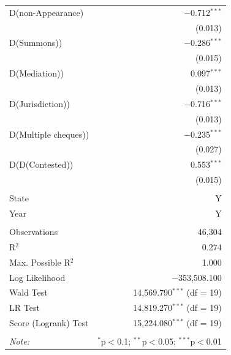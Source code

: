 \documentclass[12pt,a4paper]{article}
\begin{document}
\begin{appendices}
{\begin{longtable}[h]{lr}
 D(non-Appearance) & $-$0.712$^{***}$ \\ 
 & (0.013) \\ 
 D(Summons)) & $-$0.286$^{***}$ \\ 
 & (0.015) \\ 
 D(Mediation)) & 0.097$^{***}$ \\ 
 & (0.013) \\ 
 D(Jurisdiction)) & $-$0.716$^{***}$ \\ 
 & (0.013) \\ 
 D(Multiple cheques)) & $-$0.235$^{***}$ \\ 
 & (0.027) \\ 
 D(D(Contested)) & 0.553$^{***}$ \\ 
 & (0.015) \\ 
 \hline \\[-1.8ex]
 State & Y \\
 Year & Y \\ 
 \hline \\[-1.8ex]
 Observations & 46,304 \\ 
 R$^{2}$ & 0.274 \\ 
 Max. Possible R$^{2}$ & 1.000 \\ 
 Log Likelihood & $-$353,508.100 \\ 
 Wald Test & 14,569.790$^{***}$ (df = 19) \\ 
 LR Test & 14,819.270$^{***}$ (df = 19) \\ 
 Score (Logrank) Test & 15,224.080$^{***}$ (df = 19) \\ 
 \hline 
 \hline \\[-1.8ex] 
 \textit{Note:} & \multicolumn{1}{r}{$^{*}$p$<$0.1; $^{**}$p$<$0.05; $^{***}$p$<$0.01} \\ 
 \end{longtable}}
 
\end{appendices}

\newpage
\printbibliography[heading=bibintoc]
\end{document}
